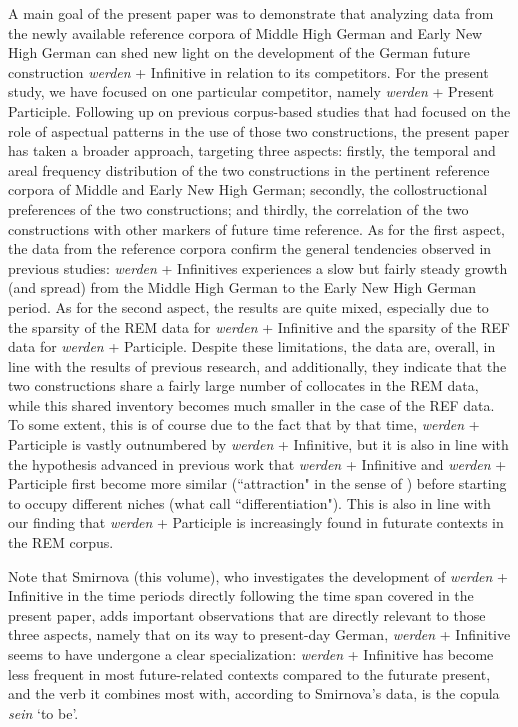 \documentclass[output=paper,colorlinks,citecolor=brown]{langscibook}
\begin{document}
A main goal of the present paper was to demonstrate that analyzing data from the newly available reference corpora of Middle High German and Early New High German can shed new light on the development of the German future construction \textit{werden} + Infinitive in relation to its competitors. For the present study, we have focused on one particular competitor, namely \textit{werden} + Present Participle. Following up on previous corpus-based studies that had focused on the role of aspectual patterns in the use of those two constructions, the present paper has taken a broader approach, targeting three aspects: firstly, the temporal and areal frequency distribution of the two constructions in the pertinent reference corpora of Middle and Early New High German; secondly, the collostructional preferences of the two constructions; and thirdly, the correlation of the two constructions with other markers of future time reference. As for the first aspect, the data from the reference corpora confirm the general tendencies observed in previous studies: \textit{werden} + Infinitives experiences a slow but fairly steady growth (and spread) from the Middle High German to the Early New High German period. As for the second aspect, the results are quite mixed, especially due to the sparsity of the REM data for \textit{werden} + Infinitive and the sparsity of the REF data for \textit{werden} + Participle. Despite these limitations, the data are, overall, in line with the results of previous research, and additionally, they indicate that the two constructions share a fairly large number of collocates in the REM data, while this shared inventory becomes much smaller in the case of the REF data. To some extent, this is of course due to the fact that by that time, \textit{werden} + Participle is vastly outnumbered by \textit{werden} + Infinitive, but it is also in line with the hypothesis advanced in previous work \citep[e.g.][]{Hartmann2021} that \textit{werden} + Infinitive and \textit{werden} + Participle first become more similar (``attraction" in the sense of \cite{DeSmet2018}) before starting to occupy different niches (what \citealt[]{DeSmet2018} call ``differentiation"). This is also in line with our finding that \textit{werden} + Participle is increasingly found in futurate contexts in the REM corpus.

Note that Smirnova (this volume), who investigates the development of \textit{werden} + Infinitive in the time periods directly following the time span covered in the present paper, adds important observations that are directly relevant to those three aspects, namely that on its way to present-day German, \textit{werden} + Infinitive seems to have undergone a clear specialization:  \textit{werden} + Infinitive has become less frequent in most future-related contexts compared to the futurate present, and the verb it combines most with, according to Smirnova's data, is the copula \textit{sein} `to be'. 
\end{document}
